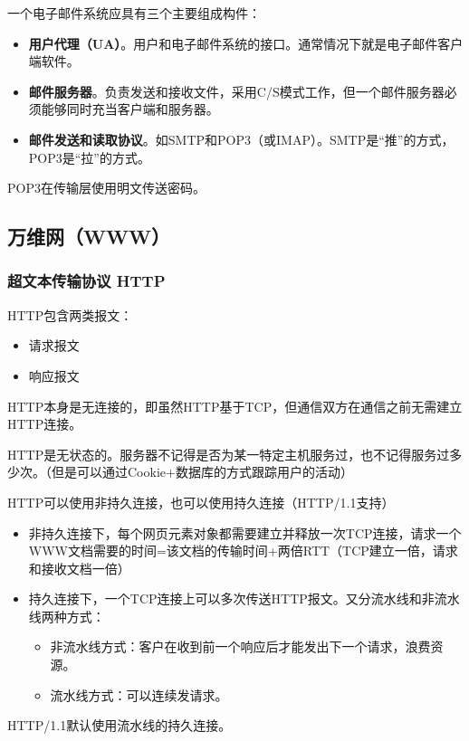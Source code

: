 \documentclass[12pt, a4paper, oneside]{ctexart}
\begin{document}
一个电子邮件系统应具有三个主要组成构件：
\begin{itemize}
    \item {\bf 用户代理（UA）}。用户和电子邮件系统的接口。通常情况下就是电子邮件客户端软件。
    \item {\bf 邮件服务器}。负责发送和接收文件，采用C/S模式工作，但一个邮件服务器必须能够同时充当客户端和服务器。
    \item {\bf 邮件发送和读取协议}。如SMTP和POP3（或IMAP）。SMTP是“推”的方式，POP3是“拉”的方式。
\end{itemize}

POP3在传输层使用明文传送密码。

\subsection{万维网（WWW）}

\subsubsection{超文本传输协议 HTTP}

HTTP包含两类报文：
\begin{itemize}
    \item 请求报文
    \item 响应报文
\end{itemize}

HTTP本身是无连接的，即虽然HTTP基于TCP，但通信双方在通信之前无需建立HTTP连接。

HTTP是无状态的。服务器不记得是否为某一特定主机服务过，也不记得服务过多少次。（但是可以通过Cookie+数据库的方式跟踪用户的活动）

HTTP可以使用非持久连接，也可以使用持久连接（HTTP/1.1支持）
\begin{itemize}
    \item 非持久连接下，每个网页元素对象都需要建立并释放一次TCP连接，请求一个WWW文档需要的时间=该文档的传输时间+两倍RTT（TCP建立一倍，请求和接收文档一倍）
    \item 持久连接下，一个TCP连接上可以多次传送HTTP报文。又分流水线和非流水线两种方式：
    \begin{itemize}
        \item 非流水线方式：客户在收到前一个响应后才能发出下一个请求，浪费资源。
        \item 流水线方式：可以连续发请求。
    \end{itemize}
\end{itemize}

HTTP/1.1默认使用流水线的持久连接。
\end{document}
